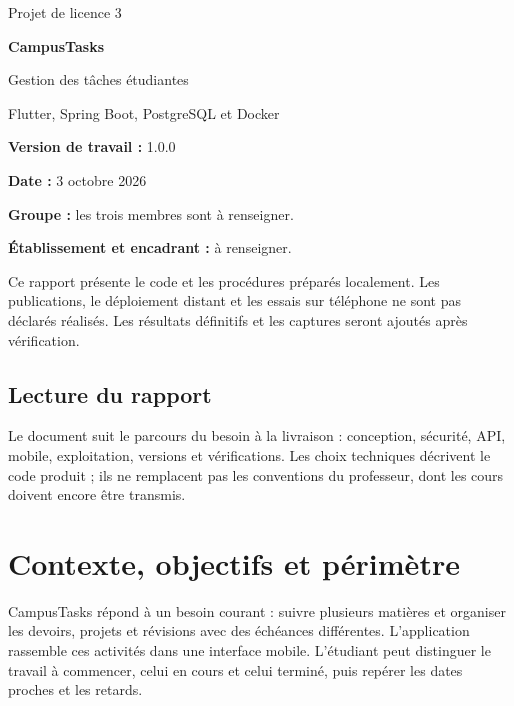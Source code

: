 \documentclass[11pt,a4paper]{article}
\begin{document}
\begin{titlepage}
\centering
\vspace*{2.2cm}
{\Large Projet de licence 3\par}
\vspace{1cm}
{\Huge\bfseries CampusTasks\par}
\vspace{0.7cm}
{\LARGE Gestion des tâches étudiantes\par}
\vspace{1cm}
{\large Flutter, Spring Boot, PostgreSQL et Docker\par}
\vspace{1.4cm}
\begin{minipage}{0.8\textwidth}
\textbf{Version de travail :} 1.0.0\par
\textbf{Date :} 3 octobre 2026\par
\textbf{Groupe :} les trois membres sont à renseigner.\par
\textbf{Établissement et encadrant :} à renseigner.\par
\end{minipage}
\vfill
\begin{minipage}{0.85\textwidth}
Ce rapport présente le code et les procédures préparés localement. Les publications, le déploiement distant et les essais sur téléphone ne sont pas déclarés réalisés. Les résultats définitifs et les captures seront ajoutés après vérification.
\end{minipage}
\end{titlepage}
\tableofcontents
\vspace{1cm}
\subsection*{Lecture du rapport}
Le document suit le parcours du besoin à la livraison : conception, sécurité, API, mobile, exploitation, versions et vérifications. Les choix techniques décrivent le code produit ; ils ne remplacent pas les conventions du professeur, dont les cours doivent encore être transmis.
\newpage
\section{Contexte, objectifs et périmètre}
CampusTasks répond à un besoin courant : suivre plusieurs matières et organiser les devoirs, projets et révisions avec des échéances différentes. L'application rassemble ces activités dans une interface mobile. L'étudiant peut distinguer le travail à commencer, celui en cours et celui terminé, puis repérer les dates proches et les retards.
\end{document}

